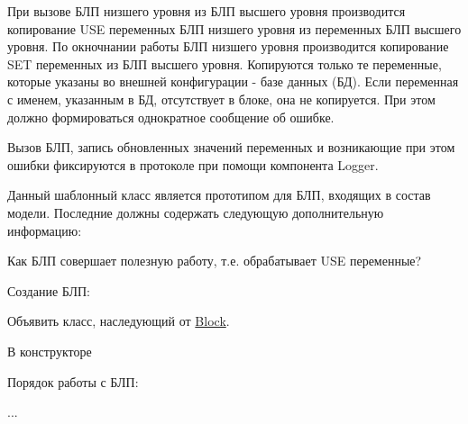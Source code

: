 При вызове БЛП низшего уровня из БЛП высшего уровня производится копирование U\-S\-E переменных БЛП низшего уровня из переменных БЛП высшего уровня. По окночнании работы БЛП низшего уровня производится копирование S\-E\-T переменных из БЛП высшего уровня. Копируются только те переменные, которые указаны во внешней конфигурации -\/ базе данных (БД). Если переменная с именем, указанным в БД, отсутствует в блоке, она не копируется. При этом должно формироваться однократное сообщение об ошибке.

Вызов БЛП, запись обновленных значений переменных и возникающие при этом ошибки фиксируются в протоколе при помощи компонента Logger.

Данный шаблонный класс является прототипом для БЛП, входящих в состав модели. Последние должны содержать следующую дополнительную информацию\-: 
\begin{DoxyItemize}
\item 
\end{DoxyItemize}

Как БЛП совершает полезную работу, т.\-е. обрабатывает U\-S\-E переменные?

Создание БЛП\-: 
\begin{DoxyItemize}
\item Объявить класс, наследующий от \hyperlink{classLIBKMS__namespace_1_1Block}{Block}. 
\item В конструкторе  
\end{DoxyItemize}

Порядок работы с БЛП\-: 
\begin{DoxyItemize}
\item ... 
\item 
\item 
\item 
\item 
\item 
\end{DoxyItemize}

